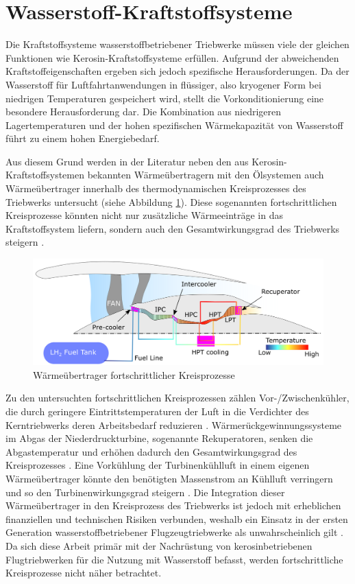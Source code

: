 \section{Wasserstoff-Kraftstoffsysteme}

Die Kraftstoffsysteme wasserstoffbetriebener Triebwerke müssen viele der gleichen Funktionen wie Kerosin-Kraftstoffsysteme erfüllen. Aufgrund der abweichenden Kraftstoffeigenschaften ergeben sich jedoch spezifische Herausforderungen. Da der Wasserstoff für Luftfahrtanwendungen in flüssiger, also kryogener Form bei niedrigen Temperaturen gespeichert wird, stellt die Vorkonditionierung eine besondere Herausforderung dar. Die Kombination aus niedrigeren Lagertemperaturen und der hohen spezifischen Wärmekapazität von Wasserstoff führt zu einem hohen Energiebedarf. \cite{Rompokos.2024, Sethi.2022}

Aus diesem Grund werden in der Literatur neben den aus Kerosin-Kraftstoffsystemen bekannten Wärmeübertragern mit den Ölsystemen auch Wärmeübertrager innerhalb des thermodynamischen Kreisprozesses des Triebwerks untersucht (siehe Abbildung \ref{fig:2.2}). Diese sogenannten fortschrittlichen Kreisprozesse könnten nicht nur zusätzliche Wärmeeinträge in das Kraftstoffsystem liefern, sondern auch den Gesamtwirkungsgrad des Triebwerks steigern \cite{Tacconi.2023}.

\begin{figure}[ht]
\centering
\includegraphics[width=0.75\linewidth]{4_Abbildungen/2_Hauptteil/Advanced Cycles.png}
  \caption{Wärmeübertrager fortschrittlicher Kreisprozesse \cite{Sethi.2022}}
  \label{fig:2.2}
\end{figure}
\FloatBarrier 

Zu den untersuchten fortschrittlichen Kreisprozessen zählen Vor-/Zwischenkühler, die durch geringere Eintrittstemperaturen der Luft in die Verdichter des Kerntriebwerks deren Arbeitsbedarf reduzieren \cite{Abedi.2022}. Wärmerückgewinnungssysteme im Abgas der Niederdruckturbine, sogenannte Rekuperatoren, senken die Abgastemperatur und erhöhen dadurch den Gesamtwirkungsgrad des Kreisprozesses \cite{Brewer.1991}. Eine Vorkühlung der Turbinenkühlluft in einem eigenen Wärmeübertrager könnte den benötigten Massenstrom an Kühlluft verringern und so den Turbinenwirkungsgrad steigern \cite{Brewer.1991}. Die Integration dieser Wärmeübertrager in den Kreisprozess des Triebwerks ist jedoch mit erheblichen finanziellen und technischen Risiken verbunden, weshalb ein Einsatz in der ersten Generation wasserstoffbetriebener Flugzeugtriebwerke als unwahrscheinlich gilt \cite{Rompokos.2024, Huete.2021}. Da sich diese Arbeit primär mit der Nachrüstung von kerosinbetriebenen Flugtriebwerken für die Nutzung mit Wasserstoff befasst, werden fortschrittliche Kreisprozesse nicht näher betrachtet. 

